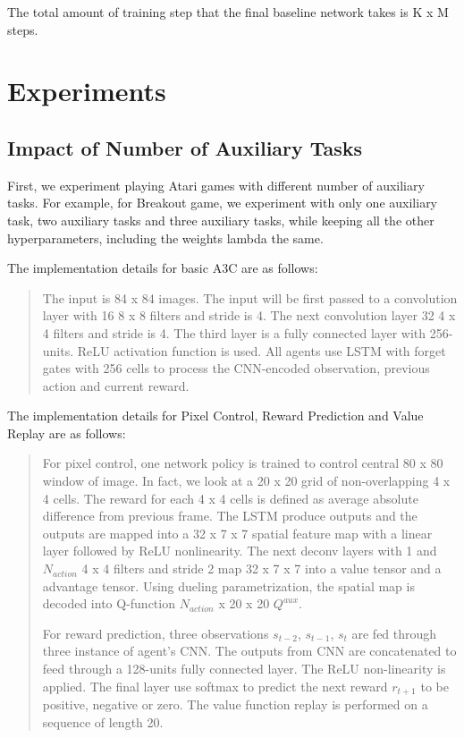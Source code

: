 \documentclass[12pt,twocolumn,letterpaper]{article}
\begin{document}
The total amount of training step that the final baseline network takes is K x M steps.


\section{Experiments}
\subsection{Impact of Number of Auxiliary Tasks}
First, we experiment playing Atari games with different number of auxiliary tasks. For example, for Breakout game, we experiment with only one auxiliary task, two auxiliary tasks and three auxiliary tasks, while keeping all the other hyperparameters, including the weights lambda the same.

The implementation details for basic A3C are as follows:
\begin{quote}

	The input is 84 x 84 images. The input will be first passed to a convolution layer with 16 8 x 8 filters and stride is 4. The next convolution layer 32 4 x 4 filters and stride is 4. The third layer is a fully connected layer with 256-units. ReLU activation function is used. All agents use LSTM with forget gates with 256 cells to process the CNN-encoded observation, previous action and current reward. 

\end{quote}

The implementation details for Pixel Control, Reward Prediction and Value Replay are as follows:

\begin{quote}

	For pixel control, one network policy is trained to control central 80 x 80 window of image. In fact, we look at a 20 x 20 grid of non-overlapping 4 x 4 cells. The reward for each 4 x 4 cells is defined as average absolute difference from previous frame. The LSTM produce outputs and the outputs are mapped into a 32 x 7 x 7 spatial feature map with a linear layer followed by ReLU nonlinearity. The next deconv layers with 1 and $N_{action}$ 4 x 4 filters and stride 2 map 32 x 7 x 7 into a value tensor and a advantage tensor. Using dueling parametrization, the spatial map is decoded into Q-function $N_{action}$ x 20 x 20 $Q^{aux}$.

For reward prediction, three observations $s_{t-2}$, $s_{t-1}$, $s_t$ are fed through three instance of agent’s CNN. The outputs from CNN are concatenated to feed through a 128-units fully connected layer. The ReLU non-linearity is applied. The final layer use softmax to predict the next reward $r_{t+1}$ to be positive, negative or zero. The value function replay is performed on a sequence of length 20.

\end{quote}
\end{document}
